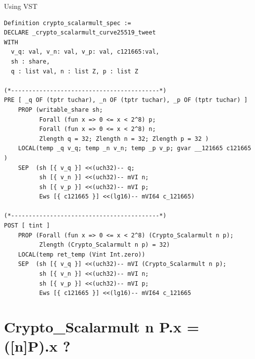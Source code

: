\documentclass[8pt]{beamer}
\begin{document}
\begin{frame}[fragile]{Using VST}
\begin{lstlisting}[language=CoqVST]
Definition crypto_scalarmult_spec :=
DECLARE _crypto_scalarmult_curve25519_tweet
WITH
  v_q: val, v_n: val, v_p: val, c121665:val,
  sh : share,
  q : list val, n : list Z, p : list Z

(*------------------------------------------*)
PRE [ _q OF (tptr tuchar), _n OF (tptr tuchar), _p OF (tptr tuchar) ]
    PROP (writable_share sh;
          Forall (fun x => 0 <= x < 2^8) p;
          Forall (fun x => 0 <= x < 2^8) n;
          Zlength q = 32; Zlength n = 32; Zlength p = 32 )
    LOCAL(temp _q v_q; temp _n v_n; temp _p v_p; gvar __121665 c121665 )
    SEP  (sh [{ v_q }] <<(uch32)-- q;
          sh [{ v_n }] <<(uch32)-- mVI n;
          sh [{ v_p }] <<(uch32)-- mVI p;
          Ews [{ c121665 }] <<(lg16)-- mVI64 c_121665)

(*------------------------------------------*)
POST [ tint ]
    PROP (Forall (fun x => 0 <= x < 2^8) (Crypto_Scalarmult n p);
          Zlength (Crypto_Scalarmult n p) = 32)
    LOCAL(temp ret_temp (Vint Int.zero))
    SEP  (sh [{ v_q }] <<(uch32)-- mVI (Crypto_Scalarmult n p);
          sh [{ v_n }] <<(uch32)-- mVI n;
          sh [{ v_p }] <<(uch32)-- mVI p;
          Ews [{ c121665 }] <<(lg16)-- mVI64 c_121665
\end{lstlisting}
\end{frame}

\section{Crypto\_Scalarmult n P.x = ([n]P).x ?}
\end{document}
